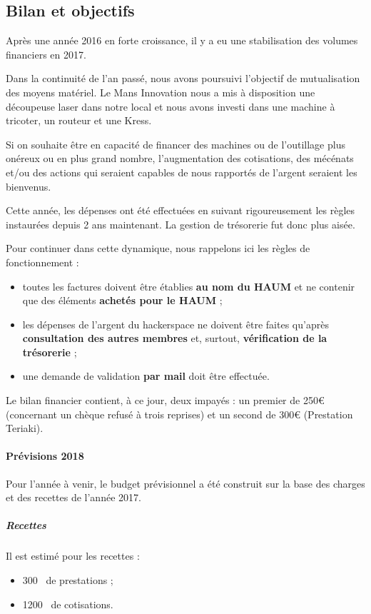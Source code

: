 \documentclass[11pt]{article}
\begin{document}
\subsection{Bilan et objectifs}
Après une année 2016 en forte croissance, il y a eu une stabilisation des volumes
financiers en 2017.

Dans la continuité de l'an passé, nous avons poursuivi l'objectif de mutualisation
des moyens matériel. Le Mans Innovation nous a mis à disposition une découpeuse laser
dans notre local et nous avons investi dans une machine à tricoter, un routeur
et une Kress.

Si on souhaite être en capacité de financer des machines ou de l'outillage plus onéreux
ou en plus grand nombre, l'augmentation des cotisations, des mécénats et/ou des
actions qui seraient capables de nous rapportés de l'argent seraient les bienvenus.

Cette année, les dépenses ont été effectuées en suivant rigoureusement les règles
instaurées depuis 2 ans maintenant. La gestion de trésorerie fut donc plus aisée.

Pour continuer dans cette dynamique, nous rappelons ici les règles de fonctionnement :
\begin{itemize}
 \item toutes les factures doivent être établies \textbf{au nom du HAUM} et ne
 contenir que des éléments \textbf{achetés pour le HAUM} ;
 \item les dépenses de l'argent du hackerspace ne doivent être faites qu'après
 \textbf{consultation des autres membres} et, surtout, \textbf{vérification de la
 trésorerie} ;
 \item une demande de validation \textbf{par mail} doit être effectuée.
\end{itemize}

Le bilan financier contient, à ce jour, deux impayés : un premier de 250\euro{}
(concernant un chèque refusé à trois reprises) et un second de 300\euro{} (Prestation
Teriaki).

\paragraph{Prévisions 2018}
Pour l'année à venir, le budget prévisionnel a été construit sur la base des charges
et des recettes de l'année 2017.

\subparagraph{Recettes}
Il est estimé pour les recettes :
\begin{itemize}
 \item 300\officialeuro~ de prestations ;
 \item 1200\officialeuro~ de cotisations.
\end{itemize}
\end{document}
